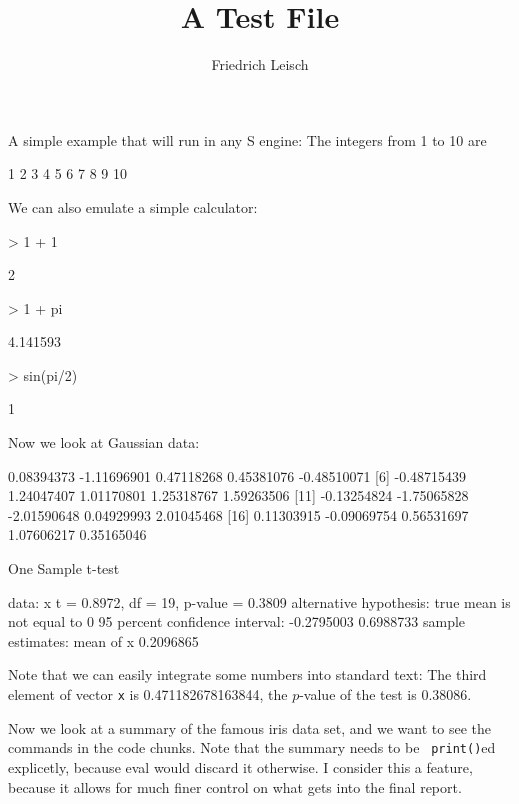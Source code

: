 \documentclass[a4paper]{article}
\begin{document}
\title{A Test File}
\author{Friedrich Leisch}
\maketitle

A simple example that will run in any S engine: The integers from 1 to 10
are \begin{Soutput}
 [1]  1  2  3  4  5  6  7  8  9 10
\end{Soutput}

We can also emulate a simple calculator: 
\begin{Sinput}
> 1 + 1
\end{Sinput}
\begin{Soutput}
[1] 2
\end{Soutput}
\begin{Sinput}
> 1 + pi
\end{Sinput}
\begin{Soutput}
[1] 4.141593
\end{Soutput}
\begin{Sinput}
> sin(pi/2)
\end{Sinput}
\begin{Soutput}
[1] 1
\end{Soutput}

Now we look at Gaussian data:

\begin{Soutput}
 [1]  0.08394373 -1.11696901  0.47118268  0.45381076 -0.48510071
 [6] -0.48715439  1.24047407  1.01170801  1.25318767  1.59263506
[11] -0.13254824 -1.75065828 -2.01590648  0.04929993  2.01045468
[16]  0.11303915 -0.09069754  0.56531697  1.07606217  0.35165046
\end{Soutput}
\begin{Soutput}
	One Sample t-test

data:  x 
t = 0.8972, df = 19, p-value = 0.3809
alternative hypothesis: true mean is not equal to 0 
95 percent confidence interval:
 -0.2795003  0.6988733 
sample estimates:
mean of x 
0.2096865 
\end{Soutput}
Note that we can easily integrate some numbers into standard text: The third
element of vector \texttt{x} is 0.471182678163844, the $p$-value of the test
is 0.38086. %

Now we look at a summary of the famous iris data set, and we want to see the
commands in the code chunks. Note that the summary needs to be \texttt{%
print()}ed explicetly, because eval would discard it otherwise. I consider
this a feature, because it allows for much finer control on what gets into
the final report.
\end{document}
